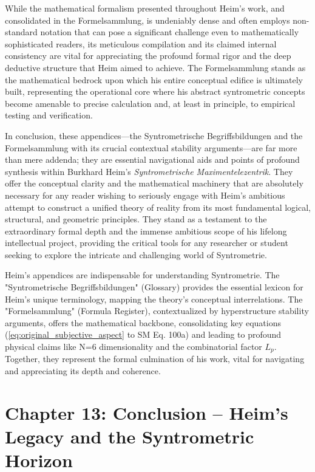 \documentclass[12pt]{article}
\begin{document}
While the mathematical formalism presented throughout Heim's work, and consolidated in the Formelsammlung, is undeniably dense and often employs non-standard notation that can pose a significant challenge even to mathematically sophisticated readers, its meticulous compilation and its claimed internal consistency are vital for appreciating the profound formal rigor and the deep deductive structure that Heim aimed to achieve. The Formelsammlung stands as the mathematical bedrock upon which his entire conceptual edifice is ultimately built, representing the operational core where his abstract syntrometric concepts become amenable to precise calculation and, at least in principle, to empirical testing and verification.

In conclusion, these appendices—the Syntrometrische Begriffsbildungen and the Formelsammlung with its crucial contextual stability arguments—are far more than mere addenda; they are essential navigational aids and points of profound synthesis within Burkhard Heim's \textit{Syntrometrische Maximentelezentrik}. They offer the conceptual clarity and the mathematical machinery that are absolutely necessary for any reader wishing to seriously engage with Heim's ambitious attempt to construct a unified theory of reality from its most fundamental logical, structural, and geometric principles. They stand as a testament to the extraordinary formal depth and the immense ambitious scope of his lifelong intellectual project, providing the critical tools for any researcher or student seeking to explore the intricate and challenging world of Syntrometrie.

Heim's appendices are indispensable for understanding Syntrometrie. The "Syntrometrische Begriffsbildungen" (Glossary) provides the essential lexicon for Heim's unique terminology, mapping the theory's conceptual interrelations. The "Formelsammlung" (Formula Register), contextualized by hyperstructure stability arguments, offers the mathematical backbone, consolidating key equations (\eqref{eq:original_subjective_aspect} to SM Eq. 100a) and leading to profound physical claims like N=6 dimensionality and the combinatorial factor \(L_p\). Together, they represent the formal culmination of his work, vital for navigating and appreciating its depth and coherence.

\clearpage 

\section{Chapter 13: Conclusion – Heim’s Legacy and the Syntrometric Horizon}
\label{sec:conclusion}
\end{document}
